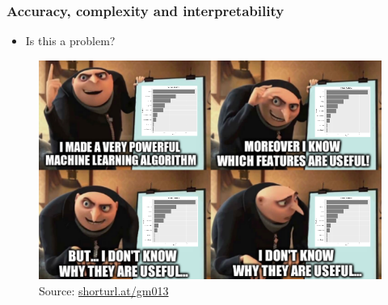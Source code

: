 \documentclass[
  shownotes,
  xcolor={svgnames},
  hyperref={colorlinks,citecolor=DarkBlue,linkcolor=DarkRed,urlcolor=DarkBlue}
  ]{beamer}
\begin{document}
\begin{frame}
\frametitle{Accuracy, complexity and interpretability}

\begin{itemize}
  \item Is this a problem?
\end{itemize}

\bigskip

\begin{figure}[H] \centering
  \centering
  \includegraphics[scale=0.3]{figures/feature_importance.png}
  \\
  \tiny
  Source: \url{shorturl.at/gm013}
  \end{figure}

\end{frame}
\end{document}
